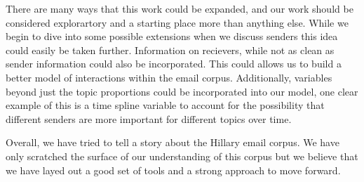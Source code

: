 \documentclass[12pt]{article}
\theoremstyle{definition}
\theoremstyle{algodesc}
\begin{document}
There are many ways that this work could be expanded, and our work should be considered explorartory and a starting place more than anything else. While we begin to dive into some possible extensions when we discuss senders this idea could easily be taken further. Information on recievers, while not as clean as sender information could also be incorporated. This could allows us to build a better model of interactions within the email corpus. Additionally, variables beyond just the topic proportions could be incorporated into our model, one clear example of this is a time spline variable to account for the possibility that different senders are more important for different topics over time.

Overall, we have tried to tell a story about the Hillary email corpus. We have only scratched the surface of our understanding of this corpus but we believe that we have layed out a good set of tools and a strong approach to move forward.



\end{document}
